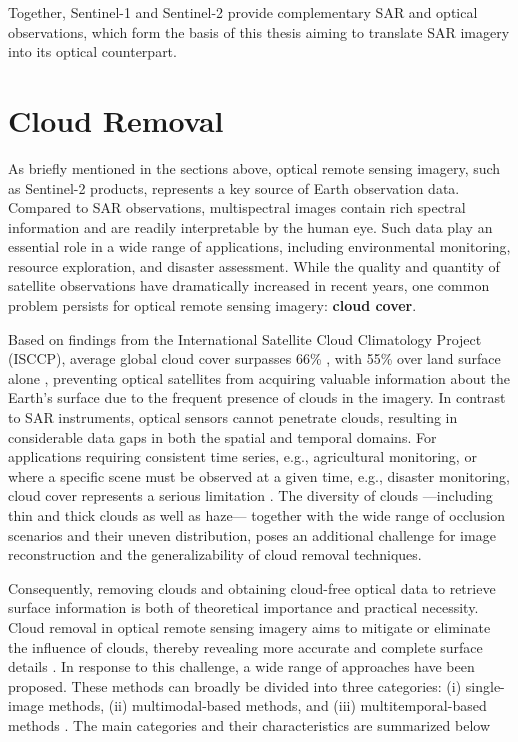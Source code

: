 Together, Sentinel-1 and Sentinel-2 provide complementary SAR and optical observations, which form the basis of this thesis aiming to translate SAR imagery into its optical counterpart.

\section{Cloud Removal}
As briefly mentioned in the sections above, optical remote sensing imagery, such as Sentinel-2 products, represents a key source of Earth observation data. Compared to SAR observations, multispectral images contain rich spectral information and are readily interpretable by the human eye. Such data play an essential role in a wide range of applications, including environmental monitoring, resource exploration, and disaster assessment. While the quality and quantity of satellite observations have dramatically increased in recent years, one common problem persists for optical remote sensing imagery: \textbf{cloud cover}.

Based on findings from the International Satellite Cloud Climatology Project (ISCCP), average global cloud cover surpasses 66\% \cite{dl_cloud_detection_survey,aCGAN_fuse_sar_MS,CR_SEN2_dRNN}, with 55\% over land surface alone \cite{CR_SEN2_dRNN}, preventing optical satellites from acquiring valuable information about the Earth's surface due to the frequent presence of clouds in the imagery. In contrast to SAR instruments, optical sensors cannot penetrate clouds, resulting in considerable data gaps in both the spatial and temporal domains. For applications requiring consistent time series, e.g., agricultural monitoring, or where a specific scene must be observed at a given time, e.g., disaster monitoring, cloud cover represents a serious limitation \cite{CR_SEN2_dRNN}. The diversity of clouds —including thin and thick clouds as well as haze— together with the wide range of occlusion scenarios and their uneven distribution, poses an additional challenge for image reconstruction and the generalizability of cloud removal techniques\cite{CR_Advances_Review_ORS}.

Consequently, removing clouds and obtaining cloud-free optical data to retrieve surface information is both of theoretical importance and practical necessity. Cloud removal in optical remote sensing imagery aims to mitigate or eliminate the influence of clouds, thereby revealing more accurate and complete surface details \cite{CR_Advances_Review_ORS}. In response to this challenge, a wide range of approaches have been proposed. These methods can broadly be divided into three categories: (i) single-image methods, (ii) multimodal-based methods, and (iii) multitemporal-based methods \cite{CR_Advances_Review_ORS}. The main categories and their characteristics are summarized below

